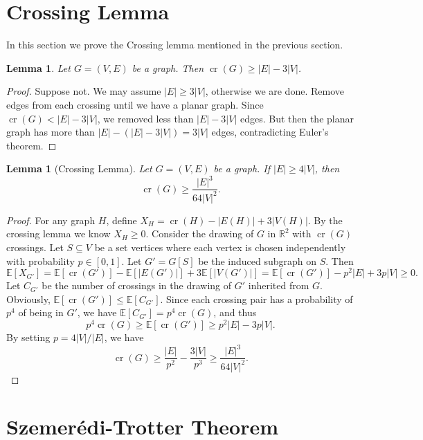 \documentclass[10pt,reqno]{amsart}
\newtheorem{lemma}[theorem]{Lemma}
\theoremstyle{definition}
\theoremstyle{remark}
\renewcommand{\leq}{\leqslant}
\renewcommand{\geq}{\geqslant}
\def\R{\mathbb{R}}
\def\E{\mathbb{E}}
\def\cr{\operatorname{cr}}
\numberwithin{equation}{section}
\begin{document}
\newpage

\section{Crossing Lemma}

In this section we prove the Crossing lemma mentioned in the previous section. 


\begin{lemma}
	Let $G = (V, E)$ be a graph. Then $\cr(G) \geq |E| - 3|V|$. 
\end{lemma}

\begin{proof}
	Suppose not. We may assume $|E| \geq 3|V|$, otherwise we are done. Remove edges from each crossing until we have a planar graph. Since $\cr(G) < |E| - 3|V|$, we removed less than $|E| - 3|V|$ edges. But then the planar graph has more than $|E| - (|E| - 3|V|) = 3|V|$ edges, contradicting Euler's theorem. 
\end{proof}

\begin{lemma}[Crossing Lemma]
	Let $G = (V, E)$ be a graph. If $|E| \geq 4|V|$, then
	\[
		\cr(G) \geq \frac{|E|^3}{64|V|^2}.
	\]
\end{lemma}

\begin{proof}
	For any graph $H$, define $X_H = \cr(H) - |E(H)| + 3|V(H)|$. By the crossing lemma we know $X_H \geq 0$. Consider the drawing of $G$ in $\R^2$ with $\cr(G)$ crossings. Let $S \subseteq V$ be a set vertices where each vertex is chosen independently with probability $p \in [0, 1]$. Let $G' = G[S]$ be the induced subgraph on $S$. Then
	\[
		\E[X_{G'}] = \E[\cr(G')] - \E[|E(G')|] + 3\E[|V(G')|] = \E[\cr(G')] - p^2|E| + 3p|V| \geq 0.
	\]
	Let $C_{G'}$ be the number of crossings in the drawing of $G'$ inherited from $G$. Obviously, $\E[\cr(G')] \leq \E[C_{G'}]$. Since each crossing pair has a probability of $p^4$ of being in $G'$, we have $\E[C_{G'}] = p^4\cr(G)$, and thus
	\[
		p^4\cr(G) \geq \E[\cr(G')] \geq p^2|E| - 3p|V|.
	\]
	By setting $p = 4|V|/|E|$, we have
	\[
		\cr(G) \geq \frac{|E|}{p^2} - \frac{3|V|}{p^3} \geq \frac{|E|^3}{64|V|^2}.
	\]
\end{proof}

\newpage

\section{Szemerédi-Trotter Theorem}
\end{document}
